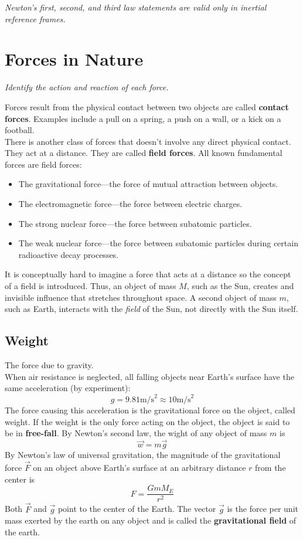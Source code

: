 \documentclass[11pt,a4paper]{report}
\begin{document}
\hspace{1mm}

\noindent
\textit{Newton's first, second, and third law statements are valid only in inertial reference frames.}

\section{Forces in Nature}
\textit{Identify the action and reaction of each force.}

\hspace{1mm}

\noindent
Forces result from the physical contact between two objects are called \textbf{contact forces}. Examples include a pull on a spring, a push on a wall, or a kick on a football.
\\There is another class of forces that doesn't involve any direct physical contact. They act at a distance. They are called \textbf{field forces}. All known fundamental forces are field forces:
\begin{itemize}
	\item The gravitational force---the force of mutual attraction between objects.
	\item The electromagnetic force---the force between electric charges.
	\item The strong nuclear force---the force between subatomic particles.
	\item The weak nuclear force---the force between subatomic particles during certain radioactive decay processes.
\end{itemize}
It is conceptually hard to imagine a force that acts at a distance so the concept of a field is introduced. Thus, an object of mass $M$, such as the Sun, creates and invisible influence that stretches throughout space. A second object of mass $m$, such as Earth, interacts with the \textit{field} of the Sun, not directly with the Sun itself.

\hspace{1mm}

\subsection{Weight}The force due to gravity.
\\When air resistance is neglected, all falling objects near Earth's surface have the same acceleration (by experiment): $$g=9.81 \mathrm{ m/s} ^2 \approx 10 \mathrm{ m/s} ^2$$
The force causing this acceleration is the gravitational force on the object, called weight. If the weight is the only force acting on the object, the object is said to be in \textbf{free-fall}. By Newton's second law, the wight of any object of mass $m$ is $$\vec{w} = m \vec{g}$$
By Newton's law of universal gravitation, the magnitude of the gravitational force $\vec{F}$ on an object above Earth's surface at an arbitrary distance $r$ from the center is $$F = \frac{GmM_E}{r^2}$$
Both $\vec{F}$ and $\vec{g}$ point to the center of the Earth. The vector $\vec{g}$ is the force per unit mass exerted by the earth on any object and is called the \textbf{gravitational field} of the earth.
\end{document}
